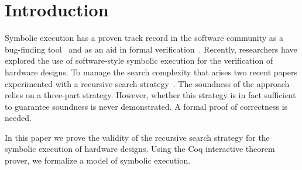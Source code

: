 \section{Introduction}

Symbolic execution has a proven track record in the software community as a
bug-finding tool~\cite{} and as an aid in formal verification~\cite{}. Recently,
researchers have explored the use of software-style symbolic execution for the
verification of hardware designs. To manage the search complexity that arises
two recent papers experimented with a recursive search strategy~\cite{}. The
soundness of the approach relies on a three-part strategy. However, whether this
strategy is in fact sufficient to guarantee soundness is never demonstrated. A
formal proof of correctness is needed.

In this paper we prove the validity of the recursive search strategy for the
symbolic execution of hardware designs. Using the Coq interactive theorem
prover, we formalize a model of symbolic execution. 
